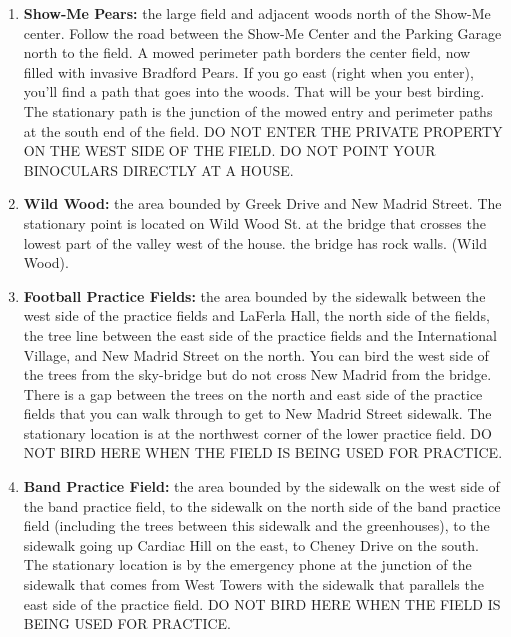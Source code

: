 \documentclass[12pt]{article}
\begin{document}
\begin{enumerate}
\item \textbf{Show-Me Pears:} the large field and adjacent woods north of the Show-Me center. Follow the road between the Show-Me Center and the Parking Garage north to the field. A mowed perimeter path borders the center field, now filled with invasive Bradford Pears. If you go east (right when you enter), you'll find a path that goes into the woods. That will be your best birding. The stationary path is the junction of the mowed entry and perimeter paths at the south end of the field. DO NOT ENTER THE PRIVATE PROPERTY ON THE WEST SIDE OF THE FIELD. DO NOT POINT YOUR BINOCULARS DIRECTLY AT A HOUSE.

\item \textbf{Wild Wood:} the area bounded by Greek Drive and New Madrid Street. The stationary point is located on Wild Wood St. at the bridge that crosses the lowest part of the valley west of the house. the bridge has rock walls. (Wild Wood).

\item \textbf{Football Practice Fields:} the area bounded by the sidewalk between the west side of the practice fields and LaFerla Hall, the north side of the fields, the tree line between the east side of the practice fields and the International Village, and New Madrid Street on the north. You can bird the west side of the trees from the sky-bridge but do not cross New Madrid from the bridge. There is a gap between the trees on the north and east side of the practice fields that you can walk through to get to New Madrid Street sidewalk. The stationary location is at the northwest corner of the lower practice field. DO NOT BIRD HERE WHEN THE FIELD IS BEING USED FOR PRACTICE.

%
\item \textbf{Band Practice Field:} the area bounded by the sidewalk on the west side of the band practice field, to the sidewalk on the north side of the band practice field (including the trees between this sidewalk and the greenhouses), to the sidewalk going up Cardiac Hill on the east, to Cheney Drive on the south. The stationary location is by the emergency phone at the junction of the sidewalk that comes from West Towers with the sidewalk that parallels the east side of the practice field.  DO NOT BIRD HERE WHEN THE FIELD IS BEING USED FOR PRACTICE.


\end{enumerate}
\end{document}

